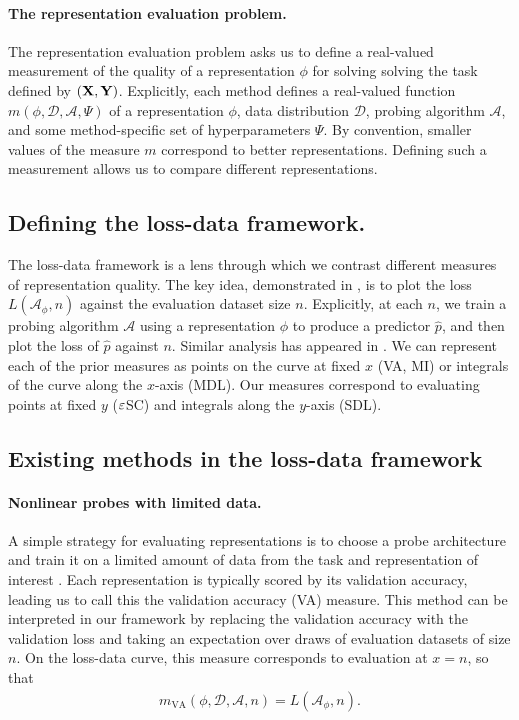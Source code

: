 \paragraph{The representation evaluation problem.} The representation evaluation problem asks us to define a real-valued measurement of the quality of a representation $ \phi$ for solving solving the task defined by $({\mathbf{X}}, {\mathbf{Y}})$. Explicitly, each method defines a real-valued function $ m(\phi, \mathcal{D}, \mathcal{A}, \Psi)$ of a representation $\phi$, data distribution $ \mathcal{D}$, probing algorithm $ \mathcal{A}$, and some method-specific set of hyperparameters $ \Psi $. By convention, smaller values of the measure $ m $ correspond to better representations.
Defining such a measurement allows us to compare different representations.



\subsection{Defining the loss-data framework.}
The loss-data framework is a lens through which we contrast different measures  of representation quality. The key idea, demonstrated in , is to plot the loss $ L(\mathcal{A}_\phi, n) $ against the evaluation dataset size $ n$.
Explicitly, at each $ n$, we train a probing algorithm $ \mathcal{A}$ using a representation $ \phi$ to produce a predictor $ \hat p$, and then plot the loss of $ \hat p$ against $ n$.
Similar analysis has appeared in \citet{Voita2020InformationTheoreticPW, Yogatama2019LinguisticIntel, Talmor2019oLMpics}.
We can represent each of the prior measures as points on the curve at fixed $ x $ (VA, MI) or integrals of the curve along the $ x$-axis (MDL).
Our measures correspond to evaluating points at fixed $ y $ ($\varepsilon$SC) and integrals along the $ y$-axis (SDL).


\subsection{Existing methods in the loss-data framework} \label{sec:existing_methods}

\paragraph{Nonlinear probes with limited data.}

A simple strategy for evaluating representations is to choose a probe architecture and train it on a limited amount of data from the task and representation of interest \citep{Hnaff2020DataEfficientIR, Zhang2018LanguageMT}.
Each representation is typically scored by its validation accuracy, leading us to call this the validation accuracy (VA) measure.
This method can be interpreted in our framework by replacing the validation accuracy with the validation loss and taking an expectation over draws of evaluation datasets of size $n$.
On the loss-data curve, this measure corresponds to evaluation at $x=n$, so that
\begin{align}
    m_{\mathrm{VA}}(\phi, \mathcal{D}, \mathcal{A}, n) = L(\mathcal{A}_\phi, n).
\end{align}

